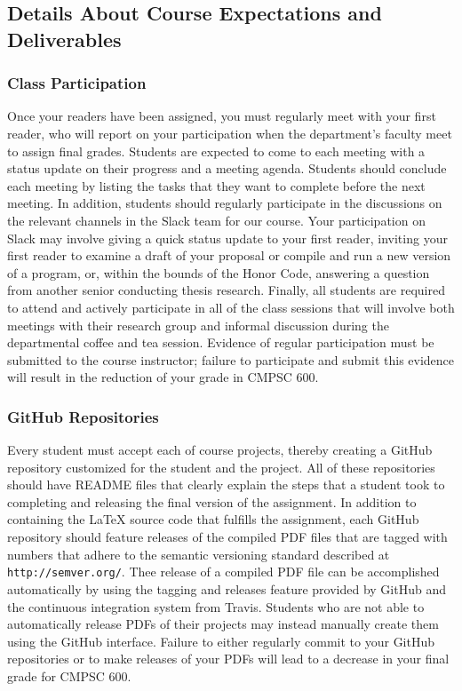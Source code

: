 \documentclass[11pt]{article}
\newcommand{\url}[1]{\lstinline{#1}}
\begin{document}
\subsection*{Details About Course Expectations and Deliverables}

\subsubsection*{Class Participation}

Once your readers have been assigned, you must regularly meet with your first
reader, who will report on your participation when the department's faculty meet
to assign final grades.  Students are expected to come to each meeting with a
status update on their progress and a meeting agenda.  Students should conclude
each meeting by listing the tasks that they want to complete before the next
meeting. In addition, students should regularly participate in the discussions
on the relevant channels in the Slack team for our course. Your participation on
Slack may involve giving a quick status update to your first reader, inviting
your first reader to examine a draft of your proposal or compile and run a new
version of a program, or, within the bounds of the Honor Code, answering a
question from another senior conducting thesis research.  Finally, all students
are required to attend and actively participate in all of the class sessions
that will involve both meetings with their research group and informal
discussion during the departmental coffee and tea session. Evidence of regular
participation must be submitted to the course instructor; failure to participate
and submit this evidence will result in the reduction of your grade in CMPSC
600.

\subsubsection*{GitHub Repositories}

Every student must accept each of course projects, thereby creating a GitHub
repository customized for the student and the project. All of these repositories
should have README files that clearly explain the steps that a student took to
completing and releasing the final version of the assignment. In addition to
containing the \LaTeX{} source code that fulfills the assignment, each GitHub
repository should feature releases of the compiled PDF files that are tagged
with numbers that adhere to the semantic versioning standard described at
\url{http://semver.org/}. Thee release of a compiled PDF file can be
accomplished automatically by using the tagging and releases feature provided by
GitHub and the continuous integration system from Travis. Students who are not
able to automatically release PDFs of their projects may instead manually create
them using the GitHub interface. Failure to either regularly commit to your
GitHub repositories or to make releases of your PDFs will lead to a decrease in
your final grade for CMPSC 600.
\end{document}
